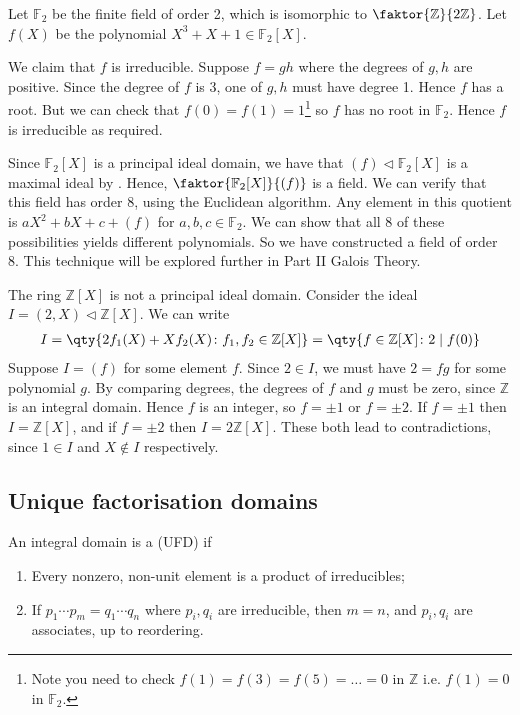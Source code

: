 \begin{example}
	Let $\mathbb F_2$ be the finite field of order 2, which is isomorphic to $\faktor{\mathbb Z}{2 \mathbb Z}$.
	Let $f(X)$ be the polynomial $X^3 + X + 1 \in \mathbb F_2[X]$.

	We claim that $f$ is irreducible.
	Suppose $f = gh$ where the degrees of $g, h$ are positive.
	Since the degree of $f$ is 3, one of $g, h$ must have degree 1.
	Hence $f$ has a root.
	But we can check that $f(0) = f(1) = 1$\footnote{Note you need to check $f(1) = f(3) = f(5) = \dots = 0$ in $\mathbb{Z}$ i.e. $f(1) = 0$ in $\mathbb{F}_2$.} so $f$ has no root in $\mathbb F_2$.
	Hence $f$ is irreducible as required.

	Since $\mathbb F_2[X]$ is a principal ideal domain, we have that $(f) \triangleleft \mathbb F_2[X]$ is a maximal ideal by .
	Hence, $\faktor{\mathbb F_2[X]}{(f)}$ is a field.
	We can verify that this field has order 8, using the Euclidean algorithm.
	Any element in this quotient is $aX^2 + bX + c + (f)$ for $a,b,c \in \mathbb F_2$.
	We can show that all 8 of these possibilities yields different polynomials.
	So we have constructed a field of order 8.
	This technique will be explored further in Part II Galois Theory.
\end{example}

\begin{example}
	The ring $\mathbb Z[X]$ is not a principal ideal domain.
	Consider the ideal $I = (2, X) \triangleleft \mathbb Z[X]$.
	We can write
	\begin{align*}
		I = \qty{2f_1(X) + Xf_2(X) \colon f_1, f_2 \in \mathbb Z[X]} = \qty{f \in \mathbb Z[X] \colon 2\mid f(0)}
	\end{align*}
	Suppose $I = (f)$ for some element $f$.
	Since $2 \in I$, we must have $2 = fg$ for some polynomial $g$.
	By comparing degrees, the degrees of $f$ and $g$ must be zero, since $\mathbb Z$ is an integral domain.
	Hence $f$ is an integer, so $f = \pm 1$ or $f = \pm 2$.
	If $f = \pm 1$ then $I = \mathbb Z[X]$, and if $f = \pm 2$ then $I = 2\mathbb Z[X]$.
	These both lead to contradictions, since $1 \in I$ and $X \not\in I$ respectively.
\end{example}

\subsection{Unique factorisation domains}

\begin{definition}
	An integral domain is a  (UFD) if
	\begin{enumerate}
		\item Every nonzero, non-unit element is a product of irreducibles;
		\item If $p_1 \cdots p_m = q_1 \cdots q_n$ where $p_i, q_i$ are irreducible, then $m = n$, and $p_i, q_i$ are associates, up to reordering.
	\end{enumerate}
\end{definition}

